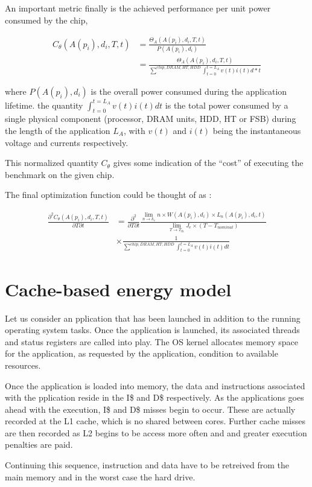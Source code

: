 \documentclass{amsart}
\begin{document}
An important metric finally is the achieved performance per unit power
consumed by the chip,

\begin{align*}
  C_{{\theta}}(A(p_i),d_i,T,t) &
  ={\frac{{\Theta}_A(A(p_i),d_i,T,t)}{P(A(p_i),d_i)}}\\
  &
  ={\frac{{\Theta}_A(A(p_i),d_i,T,t)}{\sum^{chip,DRAM,HT,HDD}\int_{t=0}^{t=L_A}v(t)i(t)d*t}}
\end{align*}

where $P (A (p_i), d_i)$ is the overall power consumed during the application
lifetime. the quantity $\int_{t = 0}^{t = L_A} v (t) i (t) dt$ is the total
power consumed by a single physical component (processor, DRAM units, HDD, HT
or FSB) during the length of the application $L_A$, with $v (t)$ and $i (t)$
being the instantaneous voltage and currents respectively.

This normalized quantity $C_{\theta}$ gives some indication of the ``cost'' of
executing the benchmark on the given chip.

The final optimization function could be thought of as :

\begin{align*}
  \frac{\partial^2 C_{\theta} (A (p_i), d_i, T, t)}{\partial T \partial t} &
  = \frac{\partial^2}{\partial T \partial t} \frac{\lim_{n \to k_e} n \times W
   (A (p_i), d_i) \times L_n (A (p_i), d_i, t)}{\lim_{T \to T_{th}} J_e \times
   (T - T_{nominal})} \\ &
  \times \frac{1}{\sum^{chip, DRAM, HT, HDD} \int_{t = 0}^{t = L_A} v (t) i(t) dt}   
\end{align*}

\newline

\section{Cache-based energy model}

Let us consider an pplication that has been launched in addition to the running operating system tasks. Once the application is launched, its associated threads and status registers are called into play. The OS kernel allocates memory space for the application, as requested by the application, condition to available resources. 

Once the application is loaded into memory, the data and instructions associated with the pplication reside in the I\$ and D\$ respectively. As the applications goes ahead with the execution, I\$ and D\$ misses begin to occur. These are actually recorded at the L1 cache, which is no shared between cores. Further cache misses are then recorded as L2 begins to be access more often and and greater execution penalties are paid. 

Continuing this sequence, instruction and data have to be retreived from the main memory and in the worst case the hard drive.  
\end{document}
